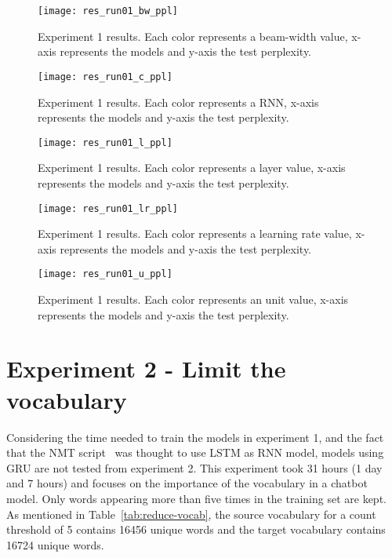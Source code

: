 \begin{landscape}
\begin{figure}
    \centering
    \texttt{[image: res\_run01\_bw\_ppl]}
    \decoRule
    \caption[Results experiment 1 BW-PPL]{Experiment 1 results. Each color represents a beam-width value, x-axis represents the models and y-axis the test perplexity.}
    \label{fig:res_run01_bw_ppl}
\end{figure}
\begin{figure}
    \centering
    \texttt{[image: res\_run01\_c\_ppl]}
    \decoRule
    \caption[Results experiment 1 C-PPL]{Experiment 1 results. Each color represents a RNN, x-axis represents the models and y-axis the test perplexity.}
    \label{fig:res_run01_c_ppl}
\end{figure}
\begin{figure}
    \centering
    \texttt{[image: res\_run01\_l\_ppl]}
    \decoRule
    \caption[Results experiment 1 L-PPL]{Experiment 1 results. Each color represents a layer value, x-axis represents the models and y-axis the test perplexity.}
    \label{fig:res_run01_l_ppl}
\end{figure}
\begin{figure}
    \centering
    \texttt{[image: res\_run01\_lr\_ppl]}
    \decoRule
    \caption[Results experiment 1 LR-PPL]{Experiment 1 results. Each color represents a learning rate value, x-axis represents the models and y-axis the test perplexity.}
    \label{fig:res_run01_lr_ppl}
\end{figure}
\begin{figure}
    \centering
    \texttt{[image: res\_run01\_u\_ppl]}
    \decoRule
    \caption[Results experiment 1 U-PPL]{Experiment 1 results. Each color represents an unit value, x-axis represents the models and y-axis the test perplexity.}
    \label{fig:res_run01_u_ppl}
\end{figure}
\end{landscape}

\section{Experiment 2 - Limit the vocabulary}
Considering the time needed to train the models in experiment 1, and the fact that the NMT script~\citep{tensorflow.nmt} was thought to use LSTM as RNN model, models using GRU are not tested from experiment 2. This experiment took 31 hours (1 day and 7 hours) and focuses on the importance of the vocabulary in a chatbot model.
Only words appearing more than five times in the training set are kept. As mentioned in Table~\ref{tab:reduce-vocab}, the source vocabulary for a count threshold of 5 contains \num{16456} unique words and the target vocabulary contains \num{16724} unique words.

